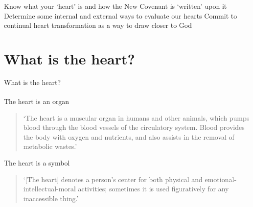 \begin{goals}
\goal Know what your `heart' is and how the New Covenant is `written' upon
it
\goal Determine some internal and external ways to evaluate our hearts
\goal Commit to continual heart transformation as a way to draw closer to
God

\end{goals}

\section{What is the heart?}

\begin{frame}{What is the heart?}
\framesubtitle{}
The heart is an organ
\begin{quote}
`The heart is a muscular organ in humans and other animals, which pumps blood through the blood vessels of the circulatory system.  Blood provides the body with oxygen and nutrients, and also assists in the removal of metabolic wastes.' 
\end{quote}

The heart is a symbol
\begin{quote}
`[The heart] denotes a person's center for both physical and emotional-intellectual-moral activities; sometimes it is used figuratively for any inaccessible thing.'
\end{quote}

\end{frame}

